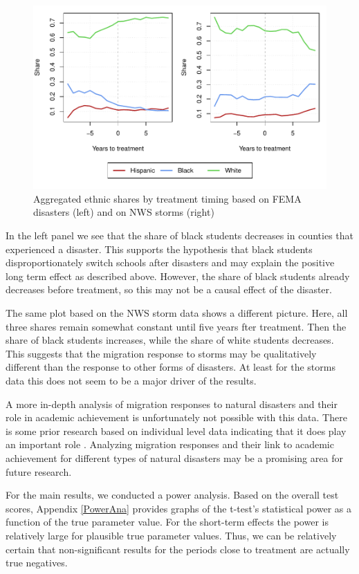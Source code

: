 \begin{figure}[!h]
	\centering
	\includegraphics[scale=1]{"../Code & Data/EthnicComposition.pdf"}
	\caption{Aggregated ethnic shares by treatment timing based on FEMA disasters (left) and on NWS storms (right)}
	\label{EthnicComposition}
\end{figure}

In the left panel we see that the share of black students decreases in counties that experienced a disaster. This supports the hypothesis that black students disproportionately switch schools after disasters and may explain the positive long term effect as described above. However, the share of black students already decreases before treatment, so this may not be a causal effect of the disaster.

The same plot based on the NWS storm data shows a different picture. Here, all three shares remain somewhat constant until five years fter treatment. Then the share of black students increases, while the share of white students decreases. This suggests that the migration response to storms may be qualitatively different than the response to other forms of disasters. At least for the storms data this does not seem to be a major driver of the results.

A more in-depth analysis of migration responses to natural disasters and their role in academic achievement is unfortunately not possible with this data. There is some prior research based on individual level data indicating that it does play an important role \citep[for example][]{Sacerdote_2012}. Analyzing migration responses and their link to academic achievement for different types of natural disasters may be a promising area for future research.

For the main results, we conducted a power analysis. Based on the overall test scores, Appendix \ref{PowerAna} provides graphs of the t-test's statistical power as a function of the true parameter value. For the short-term effects the power is relatively large for plausible true parameter values. Thus, we can be relatively certain that non-significant results for the periods close to treatment are actually true negatives.

